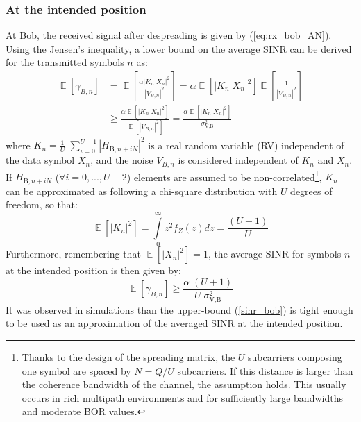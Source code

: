 \documentclass[a4paper,11pt]{article}
\begin{document}
\subsubsection{At the intended position}
At Bob, the received signal after despreading is given by (\ref{eq:rx_bob_AN}). Using the Jensen's inequality, a lower bound on the average SINR can be derived for the transmitted symbols $n$ as:
\begin{equation}
\begin{split}
    \mathop{\mathbb{E}} \left[\gamma_{B,n}\right] &= \mathop{\mathbb{E}} \left[ \frac{  \alpha \left| K_n \; X_n\right|^2  }{  \left| V_{B,n} \right|^2}  \right]  = \alpha \mathop{\mathbb{E}} \left[ \left| K_n \; X_n\right|^2 \right]  \mathop{\mathbb{E}} \left[ \frac{1}{\left| V_{B,n} \right|^2} \right]  \\
    & \geq  \frac{\alpha \mathop{\mathbb{E}} \left[ \left| K_n \; X_n\right|^2 \right] }{\mathop{\mathbb{E}} \left[ \left| V_{B,n} \right|^2 \right]} =  \frac{\alpha \mathop{\mathbb{E}} \left[ \left| K_n \; X_n\right|^2 \right] }{\sigma^2_{\text{V,B}}}
    \label{eq:RV_sinr_b}
\end{split}
\end{equation}
where $K_n = \frac{1}{U}\; \sum_{i=0}^{U-1} \left| H_{\text{B}, n + iN}\right|^2$ is a real random variable (RV) independent of the data symbol $X_n$, and the noise $V_{B,n}$ is considered independent of $K_n$ and $X_n$. If $H_{\text{B}, n + iN}$ ($\forall i = 0,...,U-2$) elements are assumed to be non-correlated\footnote{Thanks to the design of the spreading matrix, the $U$ subcarriers composing one symbol are spaced by $N = Q/U$ subcarriers. If this distance is larger than the coherence bandwidth of the channel, the assumption holds. This usually occurs in rich multipath environments and for sufficiently large bandwidths and moderate BOR values.}, $K_n$   can be approximated as following a chi-square  distribution with $U$ degrees of freedom, so that: 
\begin{equation}
    \mathop{\mathbb{E}}\left[ \left| K_n \right|^2\right] = \int \limits_{0}^{\infty} z^2  f_Z(z) dz  = \frac{(U+1)}{U}
\end{equation}
 Furthermore, remembering that $\mathop{\mathbb{E}}\left[ \left| X_n \right|^2\right] = 1$, the average SINR for symbols $n$ at the intended position is then given by:
\begin{equation}
    \mathop{\mathbb{E}} \left[\gamma_{B,n}\right] \geq \frac{\alpha \;(U+1)}{U \; \sigma_{\text{V,B}}^2}
    \label{sinr_bob}
\end{equation}
It was observed in simulations than the upper-bound (\ref{sinr_bob}) is tight enough to be used as an approximation of the averaged SINR at the intended position. 
\end{document}

